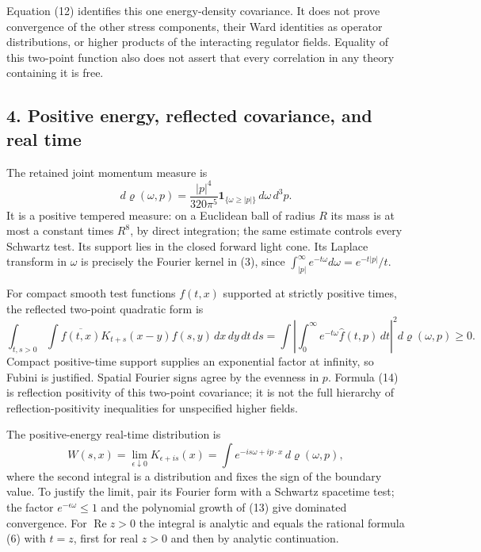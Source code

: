 \documentclass[
  11pt,
]{article}
\begin{document}
Equation (12) identifies this one energy-density covariance. It does not
prove convergence of the other stress components, their Ward identities
as operator distributions, or higher products of the interacting
regulator fields. Equality of this two-point function also does not
assert that every correlation in any theory containing it is free.

\subsection{4. Positive energy, reflected covariance, and real
time}\label{weak-coupling-part-11-positive-energy-reflected-covariance-and-real-time}

The retained joint momentum measure is \[
 d\varrho(\omega,p)=
       \frac{|p|^4}{320\pi^5}\mathbf1_{\{\omega\ge|p|\}}
                             \,d\omega\,d^3p .
 \tag{13}
\] It is a positive tempered measure: on a Euclidean ball of radius
\(R\) its mass is at most a constant times \(R^8\), by direct
integration; the same estimate controls every Schwartz test. Its support
lies in the closed forward light cone. Its Laplace transform in
\(\omega\) is precisely the Fourier kernel in (3), since
\(\int_{|p|}^\infty e^{-t\omega}d\omega=e^{-t|p|}/t\).

For compact smooth test functions \(f(t,x)\) supported at strictly
positive times, the reflected two-point quadratic form is \[
 \int_{t,s>0}\!\!\int
       \overline{f(t,x)}K_{t+s}(x-y)f(s,y)\,dx\,dy\,dt\,ds
 =
 \int\left|\int_0^\infty
              e^{-t\omega}\widehat f(t,p)\,dt\right|^2
                                      d\varrho(\omega,p)\ge0 .
 \tag{14}
\] Compact positive-time support supplies an exponential factor at
infinity, so Fubini is justified. Spatial Fourier signs agree by the
evenness in \(p\). Formula (14) is reflection positivity of this
two-point covariance; it is not the full hierarchy of
reflection-positivity inequalities for unspecified higher fields.

The positive-energy real-time distribution is \[
 W(s,x)=\lim_{\epsilon\downarrow0}K_{\epsilon+is}(x)
       =\int e^{-is\omega+ip\cdot x}\,d\varrho(\omega,p),
 \tag{15}
\] where the second integral is a distribution and fixes the sign of the
boundary value. To justify the limit, pair its Fourier form with a
Schwartz spacetime test; the factor \(e^{-\epsilon\omega}\le1\) and the
polynomial growth of (13) give dominated convergence. For
\(\operatorname{Re}z>0\) the integral is analytic and equals the
rational formula (6) with \(t=z\), first for real \(z>0\) and then by
analytic continuation.
\end{document}
